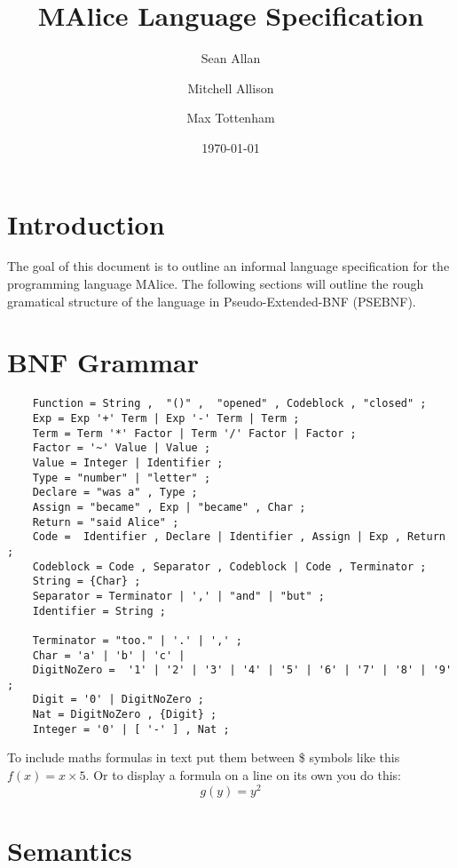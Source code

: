 \documentclass[a4wide, 11pt]{article}
\begin{document}
\title{MAlice Language Specification}

\author{Sean Allan \and Mitchell Allison \and Max Tottenham}

\date{\today}         %

\maketitle            %

\section{Introduction}

The goal of this document is to outline an informal language specification for 
the programming language MAlice. The following sections will outline the rough
gramatical structure of the language in Pseudo-Extended-BNF (PSEBNF). 

\section{BNF Grammar} 

\begin{verbatim}
	Function = String ,  "()" ,  "opened" , Codeblock , "closed" ;
	Exp = Exp '+' Term | Exp '-' Term | Term ;
	Term = Term '*' Factor | Term '/' Factor | Factor ;
	Factor = '~' Value | Value ;
	Value = Integer | Identifier ;
	Type = "number" | "letter" ;
	Declare = "was a" , Type ;
	Assign = "became" , Exp | "became" , Char ;
	Return = "said Alice" ;
	Code = 	Identifier , Declare | Identifier , Assign | Exp , Return ;
	Codeblock = Code , Separator , Codeblock | Code , Terminator ; 
	String = {Char} ;
	Separator = Terminator | ',' | "and" | "but" ; 
	Identifier = String ;
	
	Terminator = "too." | '.' | ',' ;
	Char = 'a' | 'b' | 'c' | 
	DigitNoZero =  '1' | '2' | '3' | '4' | '5' | '6' | '7' | '8' | '9' ;
	Digit = '0' | DigitNoZero ; 
	Nat = DigitNoZero , {Digit} ;
	Integer = '0' | [ '-' ] , Nat ;

\end{verbatim}

To include maths formulas in text put them between \$ symbols like this
$f(x) = x \times 5$.
Or to display a formula on a line on its own you do this:
\[
    g(y) = y^2
\]

\section{Semantics}
\end{document}
